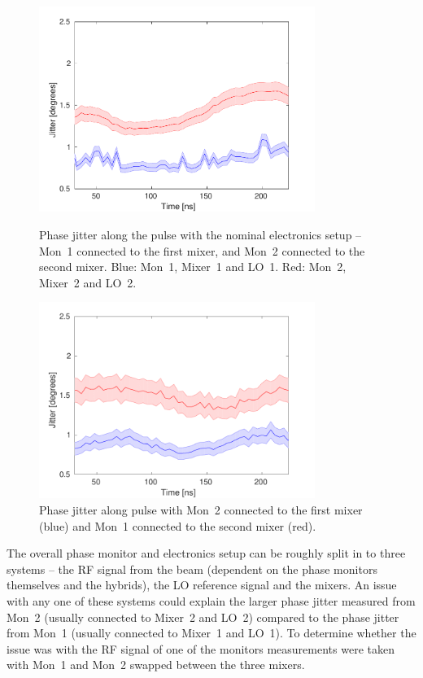 \begin{figure}
  \centering
  \includegraphics[width=0.8\textwidth]{Figures/phaseMons/Mix1Mon1_Mix2Mon2}
  \caption{Phase jitter along the pulse with the nominal electronics setup -- Mon~1 connected to the first mixer, and Mon~2 connected to the second mixer. Blue: Mon~1, Mixer~1 and LO~1. Red: Mon~2, Mixer~2 and LO~2.}
  \label{f:Mix1Mon1_Mix2Mon2}
  \includegraphics[width=0.8\textwidth]{Figures/phaseMons/Mix1Mon2_Mix2Mon1}
  \caption{Phase jitter along pulse with Mon~2 connected to the first mixer (blue) and Mon~1 connected to the second mixer (red).}
  \label{f:Mix1Mon2_Mix2Mon1}
\end{figure}

The overall phase monitor and electronics setup can be roughly split in to three systems -- the RF signal from the beam (dependent on the phase monitors themselves and the hybrids), the LO reference signal and the mixers. An issue with any one of these systems could explain the larger phase jitter measured from Mon~2 (usually connected to Mixer~2 and LO~2) compared to the phase jitter from Mon~1 (usually connected to Mixer~1 and LO~1). To determine whether the issue was with the RF signal of one of the monitors measurements were taken with Mon~1 and Mon~2 swapped between the three mixers.


